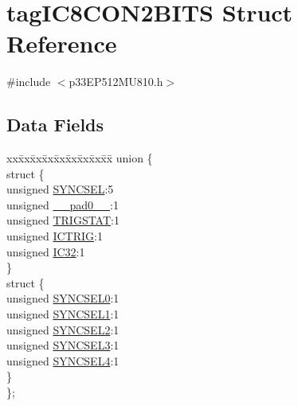 \hypertarget{structtag_i_c8_c_o_n2_b_i_t_s}{}\section{tag\+I\+C8\+C\+O\+N2\+B\+I\+TS Struct Reference}
\label{structtag_i_c8_c_o_n2_b_i_t_s}


{\ttfamily \#include $<$p33\+E\+P512\+M\+U810.\+h$>$}

\subsection*{Data Fields}
\begin{DoxyCompactItemize}
\item 
\begin{tabbing}
xx\=xx\=xx\=xx\=xx\=xx\=xx\=xx\=xx\=\kill
union \{\\
\>struct \{\\
\>\>unsigned \hyperlink{structtag_i_c8_c_o_n2_b_i_t_s_a35fbbe11485c2615ed27535b62c3fa35}{SYNCSEL}:5\\
\>\>unsigned \hyperlink{structtag_i_c8_c_o_n2_b_i_t_s_adf71f3d8410c1f1dbbc96680a92c49af}{\_\_pad0\_\_}:1\\
\>\>unsigned \hyperlink{structtag_i_c8_c_o_n2_b_i_t_s_ab379549de54ac93ad4aa73686c34cb7c}{TRIGSTAT}:1\\
\>\>unsigned \hyperlink{structtag_i_c8_c_o_n2_b_i_t_s_a79bd14cfd2e403f3a96ce0b3bb58097b}{ICTRIG}:1\\
\>\>unsigned \hyperlink{structtag_i_c8_c_o_n2_b_i_t_s_afc705120246cb4ca0c93c87817519b7f}{IC32}:1\\
\>\} \\
\>struct \{\\
\>\>unsigned \hyperlink{structtag_i_c8_c_o_n2_b_i_t_s_a3b5df3154fde5141e6ac0156425ff8b4}{SYNCSEL0}:1\\
\>\>unsigned \hyperlink{structtag_i_c8_c_o_n2_b_i_t_s_a50e73f95ab1c258ddc64f69c0991deaf}{SYNCSEL1}:1\\
\>\>unsigned \hyperlink{structtag_i_c8_c_o_n2_b_i_t_s_a304907a5d2c4cbf1114a54642a85951e}{SYNCSEL2}:1\\
\>\>unsigned \hyperlink{structtag_i_c8_c_o_n2_b_i_t_s_a6bbd1bd2ead6c9fa713969c6eb0f0c75}{SYNCSEL3}:1\\
\>\>unsigned \hyperlink{structtag_i_c8_c_o_n2_b_i_t_s_a0cd5bbe196c7974953909d27a6307bb7}{SYNCSEL4}:1\\
\>\} \\
\}; \\

\end{tabbing}\end{DoxyCompactItemize}


